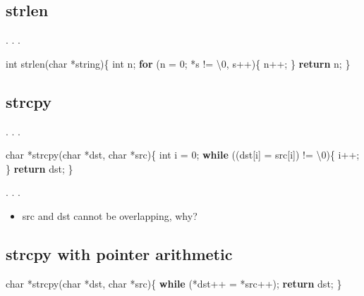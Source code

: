 \documentclass[
]{article}
\newenvironment{Shaded}{}{}
\newcommand{\CharTok}[1]{\textcolor[rgb]{0.25,0.44,0.63}{#1}}
\newcommand{\ControlFlowTok}[1]{\textcolor[rgb]{0.00,0.44,0.13}{\textbf{#1}}}
\newcommand{\DataTypeTok}[1]{\textcolor[rgb]{0.56,0.13,0.00}{#1}}
\newcommand{\DecValTok}[1]{\textcolor[rgb]{0.25,0.63,0.44}{#1}}
\newcommand{\NormalTok}[1]{#1}
\providecommand{\tightlist}{%
  \setlength{\itemsep}{0pt}\setlength{\parskip}{0pt}}
\begin{document}
\hypertarget{strlen}{%
\subsection{strlen}\label{strlen}}

. . .

\begin{Shaded}
\begin{Highlighting}[]
\DataTypeTok{int}\NormalTok{ strlen(}\DataTypeTok{char}\NormalTok{ *string)\{}
    \DataTypeTok{int}\NormalTok{ n;}
    \ControlFlowTok{for}\NormalTok{ (n = }\DecValTok{0}\NormalTok{; *s != }\CharTok{\textquotesingle{}\textbackslash{}0\textquotesingle{}}\NormalTok{, s++)\{}
\NormalTok{        n++;}
\NormalTok{    \}}
    \ControlFlowTok{return}\NormalTok{ n;}
\NormalTok{\}}
\end{Highlighting}
\end{Shaded}

\hypertarget{strcpy}{%
\subsection{strcpy}\label{strcpy}}

. . .

\begin{Shaded}
\begin{Highlighting}[]
\DataTypeTok{char}\NormalTok{ *strcpy(}\DataTypeTok{char}\NormalTok{ *dst, }\DataTypeTok{char}\NormalTok{ *src)\{}
    \DataTypeTok{int}\NormalTok{ i = }\DecValTok{0}\NormalTok{;}
    \ControlFlowTok{while}\NormalTok{ ((dst[i] = src[i]) != }\CharTok{\textquotesingle{}\textbackslash{}0\textquotesingle{}}\NormalTok{)\{}
\NormalTok{        i++;}
\NormalTok{    \}}
    \ControlFlowTok{return}\NormalTok{ dst;}
\NormalTok{\}}
\end{Highlighting}
\end{Shaded}

. . .

\begin{itemize}
\tightlist
\item
  src and dst cannot be overlapping, why?
\end{itemize}

\hypertarget{strcpy-with-pointer-arithmetic}{%
\subsection{strcpy with pointer
arithmetic}\label{strcpy-with-pointer-arithmetic}}

\begin{Shaded}
\begin{Highlighting}[]
\DataTypeTok{char}\NormalTok{ *strcpy(}\DataTypeTok{char}\NormalTok{ *dst, }\DataTypeTok{char}\NormalTok{ *src)\{}
    \ControlFlowTok{while}\NormalTok{ (*dst++ = *src++);}
    \ControlFlowTok{return}\NormalTok{ dst;}
\NormalTok{\}}
\end{Highlighting}
\end{Shaded}
\end{document}
